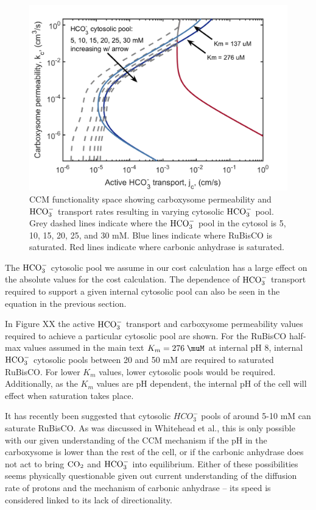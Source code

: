 \documentclass[]{article}
\begin{document}
\begin{figure}[h!]
	\includegraphics[width = \textwidth]{HcytoPool.png}
	\caption{CCM functionality space showing carboxysome permeability and ${\rm HCO_3^-}$ transport rates resulting in varying cytosolic ${\rm HCO_3^-}$ pool. Grey dashed lines indicate where the ${\rm HCO_3^-}$ pool in the cytosol is 5, 10, 15, 20, 25, and 30 mM. Blue lines indicate where RuBisCO is saturated. Red lines indicate where carbonic anhydrase is saturated.  }
\end{figure}

The ${\rm HCO_3^-}$ cytosolic pool we assume in our cost calculation has a large effect on the absolute values for the cost calculation. The dependence of ${\rm HCO_3^-}$ transport required to support a given internal cytosolic pool can also be seen in the equation in the previous section.  

In Figure XX the active ${\rm HCO_3^-}$ transport and carboxysome permeability values required to achieve a particular cytosolic pool are shown. For the RuBisCO half-max values assumed in the main text $K_m = 276 \; \muM$ at internal pH 8, internal ${\rm HCO_3^-}$ cytosolic pools between 20 and 50 mM are required to saturated RuBisCO. For lower $K_m$ values, lower cytosolic pools would be required.
Additionally, as the $K_m$ values are pH dependent, the internal pH of the cell will effect when saturation takes place.

It has recently been suggested that cytosolic ${HCO_3^-}$ pools of around 5-10 mM can saturate RuBisCO. As was discussed in Whitehead et al., this is only possible with our given understanding of the CCM mechanism if the pH in the carboxysome is lower than the rest of the cell, or if the carbonic anhydrase does not act to bring ${\rm CO_2}$ and ${\rm HCO_3^-}$ into equilibrium. Either of these possibilities seems physically questionable given out current understanding of the diffusion rate of protons and the mechanism of carbonic anhydrase -- its speed is considered linked to its lack of directionality.
\end{document}
